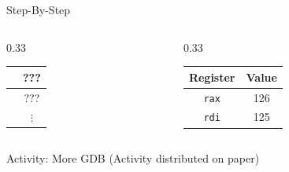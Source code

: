 \documentclass[hyphens,aspectratio=169]{beamer}
\begin{document}
\begin{frame}[fragile]{Step-By-Step}
\begin{columns}
\begin{column}{0.33\textwidth}
{\begin{tabular}{c|c|}
                & ??? \\
                \hline
                & ??? \\
                \hline
                & $\vdots$
            \end{tabular}}
        \end{column}
        \begin{column}{0.33\textwidth}
            \begin{tabular}{| c | c |}
                \hline
                Register & Value \\
                \hline
                \texttt{rax} & 126 \\
                \hline
                \texttt{rdi} & 125 \\
                \hline
            \end{tabular}
        \end{column}
    \end{columns}
\end{frame}

\begin{frame}[fragile]{Activity: More GDB}
    (Activity distributed on paper)
\end{frame}
\end{document}
